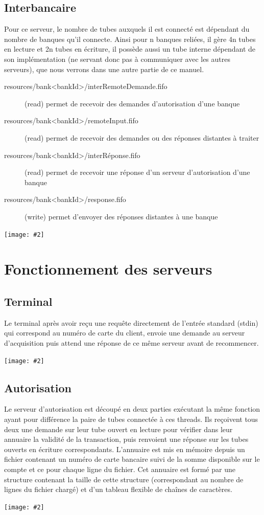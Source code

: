 \documentclass[french, a4paper, 12pt, titlepage]{article}
\newcommand{\graph}[2]{
\medskip
	\begin{center}
		\texttt{[image: \#2]}
	\end{center}
\medskip
}
\begin{document}
\subsection{Interbancaire}
Pour ce serveur, le nombre de tubes auxquels il est connecté est dépendant du nombre de banques qu'il connecte.
Ainsi pour n banques reliées, il gère 4n tubes en lecture et 2n tubes en écriture, il possède aussi un tube interne dépendant de son implémentation (ne servant donc pas à communiquer avec les autres serveurs), que nous verrons dans une autre partie de ce manuel.

\begin{description}
	\item[resources/bank<bankId>/interRemoteDemande.fifo] (read) permet de recevoir des demandes d'autorisation d'une banque
	\item[resources/bank<bankId>/remoteInput.fifo] (read) permet de recevoir des demandes ou des réponses distantes à traiter
	\item[resources/bank<bankId>/interRéponse.fifo] (read) permet de recevoir une réponse d'un serveur d'autorisation d'une banque
	\item[resources/bank<bankId>/response.fifo] (write) permet d'envoyer des réponses distantes à une banque
\end{description}
\graph{0.5}{interbancaire}

\section{Fonctionnement des serveurs}
\subsection{Terminal}
Le terminal après avoir reçu une requête directement de l'entrée standard (stdin) qui correspond au numéro de carte du client, envoie une demande au serveur d'acquisition puis attend une réponse de ce même serveur avant de recommencer.
\graph{0.4}{terminalState}

\subsection{Autorisation}
Le serveur d'autorisation est découpé en deux parties exécutant la même fonction ayant pour différence la paire de tubes connectée à ces threads.
Ils reçoivent tous deux une demande sur leur tube ouvert en lecture pour vérifier dans leur annuaire la validité de la transaction, puis renvoient une réponse sur les tubes ouverts en écriture correspondants.
L'annuaire est mis en mémoire depuis un fichier contenant un numéro de carte bancaire suivi de la somme disponible sur le compte et ce pour chaque ligne du fichier.
Cet annuaire est formé par une structure contenant la taille de cette structure (correspondant au nombre de lignes du fichier chargé) et d'un tableau flexible de chaînes de caractères.
\graph{0.4}{autorisationState}
\end{document}
